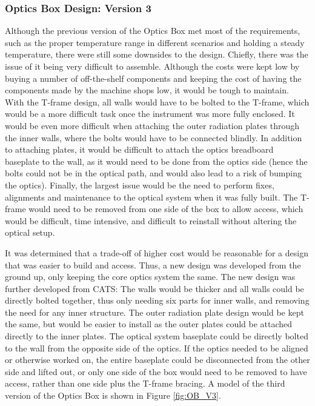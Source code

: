 \subsubsection{Optics Box Design: Version 3}
Although the previous version of the Optics Box met most of the requirements, such as the proper temperature range in different scenarios and holding a steady temperature, there were still some downsides to the design. Chiefly, there was the issue of it being very difficult to assemble. Although the costs were kept low by buying a number of off-the-shelf components and keeping the cost of having the components made by the machine shops low, it would be tough to maintain. With the T-frame design, all walls would have to be bolted to the T-frame, which would be a more difficult task once the instrument was more fully enclosed. It would be even more difficult when attaching the outer radiation plates through the inner walls, where the bolts would have to be connected blindly. In addition to attaching plates, it would be difficult to attach the optics breadboard baseplate to the wall, as it would need to be done from the optics side (hence the bolts could not be in the optical path, and would also lead to a risk of bumping the optics). Finally, the largest issue would be the need to perform fixes, alignments and maintenance to the optical system when it was fully built. The T-frame would need to be removed from one side of the box to allow access, which would be difficult, time intensive, and difficult to reinstall without altering the optical setup.

It was determined that a trade-off of higher cost would be reasonable for a design that was easier to build and access. Thus, a new design was developed from the ground up, only keeping the core optics system the same. The new design was further developed from CATS: The walls would be thicker and all walls could be directly bolted together, thus only needing six parts for inner walls, and removing the need for any inner structure. The outer radiation plate design would be kept the same, but would be easier to install as the outer plates could be attached directly to the inner plates. The optical system baseplate could be directly bolted to the wall from the opposite side of the optics. If the optics needed to be aligned or otherwise worked on, the entire baseplate could be disconnected from the other side and lifted out, or only one side of the box would need to be removed to have access, rather than one side plus the T-frame bracing. A model of the third version of the Optics Box is shown in Figure \ref{fig:OB_V3}. 


